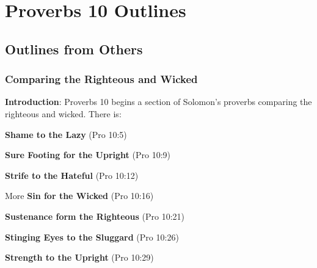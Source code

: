 \section{Proverbs 10 Outlines}

\subsection{Outlines from Others}

\subsubsection{Comparing the Righteous and Wicked}
\textbf{Introduction}: Proverbs 10 begins a section of Solomon's proverbs comparing the righteous and wicked. There is:
\begin{compactenum}[I.]
\item \textbf{Shame to the Lazy}  (Pro 10:5)
\item \textbf{Sure Footing for the Upright}  (Pro 10:9)
\item \textbf{Strife to the Hateful}  (Pro 10:12)
\item More \textbf{Sin for the Wicked}  (Pro 10:16)
\item \textbf{Sustenance form the Righteous}  (Pro 10:21)
\item \textbf{Stinging Eyes to the Sluggard}  (Pro 10:26)
\item \textbf{Strength to the Upright} (Pro 10:29)
\end{compactenum}

